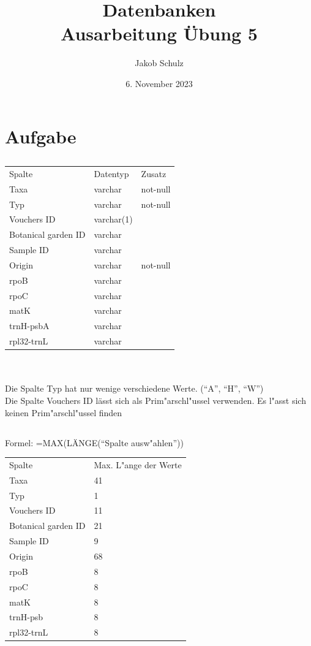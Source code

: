 \documentclass[a4paper, 11pt, titlepage]{article}
\begin{document}
\title{Datenbanken \\
Ausarbeitung \"Ubung 5}

\author{Jakob Schulz}

\date{6. November 2023}

\maketitle{\thispagestyle{plain}}

\section{Aufgabe}

\subsection{}
\begin{tabular}{lll}
Spalte&Datentyp&Zusatz\\
Taxa&varchar&not-null\\
Typ&varchar&not-null\\
Vouchers ID&varchar(1)\\
Botanical garden ID&varchar\\
Sample ID&varchar&\\
Origin&varchar&not-null\\
rpoB&varchar&\\
rpoC&varchar&\\
matK&varchar&\\
trnH-psbA&varchar&\\
rpl32-trnL&varchar&\\
\end{tabular}\\
\\
Die Spalte Typ hat nur wenige verschiedene Werte. ("`A"', "`H"', "`W"')\\
Die Spalte Vouchers ID lässt sich als Prim"arschl"ussel verwenden.
Es l"asst sich keinen Prim"arschl"ussel finden
\subsection{}
Formel: =MAX(LÄNGE("`Spalte ausw"ahlen"'))\\
\begin{tabular}{ll}
Spalte&Max. L"ange der Werte\\
Taxa&41\\
Typ&1\\
Vouchers ID&11\\
Botanical garden ID&21\\
Sample ID&9\\
Origin&68\\
rpoB&8\\
rpoC&8\\
matK&8\\
trnH-psb&8\\
rpl32-trnL&8\\
\end{tabular}\\
\end{document}

